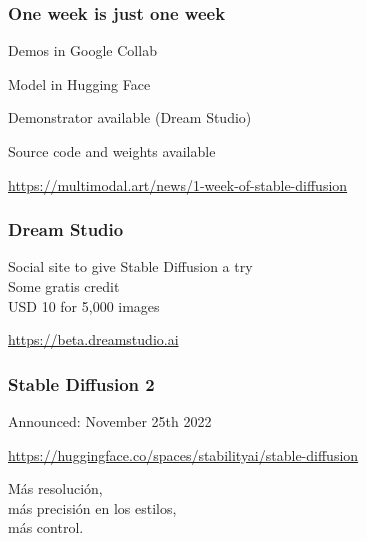 \documentclass[17pt,aspectratio=169,hyperref={pdfusetitle,colorlinks,allcolors=olive}]{beamer}
\begin{document}
\begin{frame}[fragile]
  \frametitle{One week is just one week}


  Demos in Google Collab

  Model in Hugging Face

  Demonstrator available (Dream Studio)
  
  Source code and weights available
  
    \begin{flushright}
    {\scriptsize
    \url{https://multimodal.art/news/1-week-of-stable-diffusion} \\
    }
  \end{flushright}

\end{frame}

\begin{frame}[fragile]
  \frametitle{Dream Studio}

  Social site to give Stable Diffusion a try \\
  Some gratis credit \\
  USD 10 for 5,000 images \\

  \begin{flushright}
    {
    \url{https://beta.dreamstudio.ai} \\
    }
  \end{flushright}
\end{frame}


\begin{frame}[fragile]
  \frametitle{Stable Diffusion 2}

  Announced: November 25th 2022
  
  \begin{flushright}
    {\scriptsize
      \url{https://huggingface.co/spaces/stabilityai/stable-diffusion} \\
    }
  \end{flushright}

  Más resolución,\\ más precisión en los estilos,\\ más control.\\
\end{frame}
\end{document}
